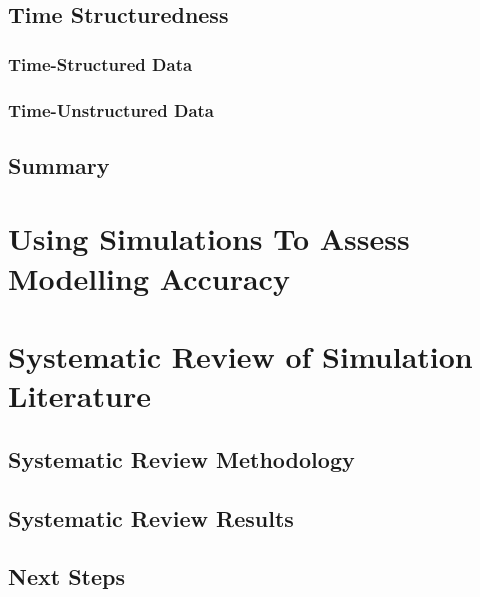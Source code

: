 \documentclass[
12pt, %
twoside,
english]{guelphthesis}
\begin{document}
\hypertarget{time-structuredness}{%
\subsection{Time Structuredness}\label{time-structuredness}}

\hypertarget{time-structured-data}{%
\subsubsection{Time-Structured Data}\label{time-structured-data}}

\hypertarget{time-unstructured-data}{%
\subsubsection{Time-Unstructured Data}\label{time-unstructured-data}}

\hypertarget{summary}{%
\subsection{Summary}\label{summary}}

\hypertarget{using-simulations-to-assess-modelling-accuracy}{%
\section{Using Simulations To Assess Modelling Accuracy}\label{using-simulations-to-assess-modelling-accuracy}}

\hypertarget{systematic-review-of-simulation-literature}{%
\section{Systematic Review of Simulation Literature}\label{systematic-review-of-simulation-literature}}

\hypertarget{systematic-review-methodology}{%
\subsection{Systematic Review Methodology}\label{systematic-review-methodology}}

\hypertarget{systematic-review-results}{%
\subsection{Systematic Review Results}\label{systematic-review-results}}

\hypertarget{next-steps}{%
\subsection{Next Steps}\label{next-steps}}
\end{document}
